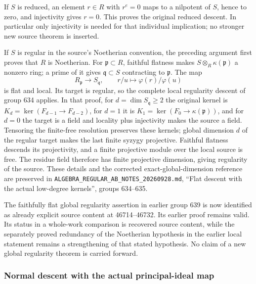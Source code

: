 If \(S\) is reduced, an element \(r\in R\) with \(r^e=0\) maps to a nilpotent of \(S\), hence to zero, and injectivity gives \(r=0\). This proves the original reduced descent. In particular only injectivity is needed for that individual implication; no stronger new source theorem is inserted.

If \(S\) is regular in the source's Noetherian convention, the preceding argument first proves that \(R\) is Noetherian. For \(\mathfrak p\subset R\), faithful flatness makes \(S\otimes_R\kappa(\mathfrak p)\) a nonzero ring; a prime of it gives \(\mathfrak q\subset S\) contracting to \(\mathfrak p\). The map \[
 R_{\mathfrak p}\longrightarrow S_{\mathfrak q},\qquad
 r/u\longmapsto\varphi(r)/\varphi(u)
\] is flat and local. Its target is regular, so the complete local regularity descent of group 634 applies. In that proof, for \(d=\dim S_{\mathfrak q}\ge2\) the original kernel is \(K_d=\ker(F_{d-1}\to F_{d-2})\), for \(d=1\) it is \(K_1=\ker(F_0\to\kappa(\mathfrak p))\), and for \(d=0\) the target is a field and locality plus injectivity makes the source a field. Tensoring the finite-free resolution preserves these kernels; global dimension \(d\) of the regular target makes the last finite syzygy projective. Faithful flatness descends its projectivity, and a finite projective module over the local source is free. The residue field therefore has finite projective dimension, giving regularity of the source. These details and the corrected exact-global-dimension reference are preserved in \texttt{ALGEBRA\_REGULAR\_AB\_NOTES\_20260928.md}, ``Flat descent with the actual low-degree kernels'', groups 634--635.

The faithfully flat global regularity assertion in earlier group 639 is now identified as already explicit source content at 46714--46732. Its earlier proof remains valid. Its status in a whole-work comparison is recovered source content, while the separately proved redundancy of the Noetherian hypothesis in the earlier local statement remains a strengthening of that stated hypothesis. No claim of a new global regularity theorem is carried forward.

\subsubsection{Normal descent with the actual principal-ideal map}\label{algebra-proof-069-normal-descent-with-the-actual-principal-ideal-map}

